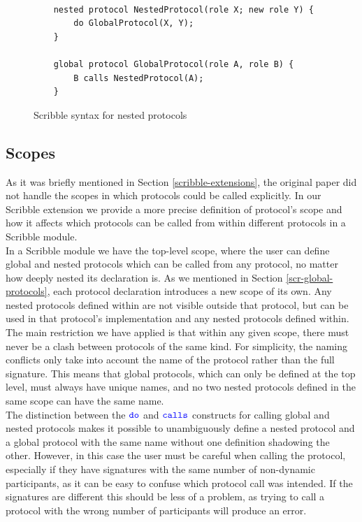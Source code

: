 \documentclass[12pt,twoside]{report}
\begin{document}
\begin{figure}[h]
    \centering
    \lstset{language=Scribble}
    \begin{lstlisting}
    
    nested protocol NestedProtocol(role X; new role Y) {
        do GlobalProtocol(X, Y);
    }
    
    global protocol GlobalProtocol(role A, role B) {
        B calls NestedProtocol(A);
    }
        \end{lstlisting}
        \caption{Scribble syntax for nested protocols}
        \label{scribble-nested-global}
    \end{figure}{}
 
\subsection{Scopes}

As it was briefly mentioned in Section \ref{scribble-extensions}, the original paper\cite{nestedprotocols} did not handle the scopes in which protocols could be called explicitly. In our Scribble extension we provide a more precise definition of protocol's scope and how it affects which protocols can be called from within different protocols in a Scribble module.\\

In a Scribble module we have the top-level scope, where the user can define global and nested protocols which can be called from any protocol, no matter how deeply nested its declaration is. As we mentioned in Section \ref{scr-global-protocols}, each protocol declaration introduces a new scope of its own.  Any nested protocols defined within are not visible outside that  protocol, but can be used in that protocol's implementation and any nested protocols defined within.\\

The main restriction we have applied is that within any given scope, there must never be a clash between protocols of the same kind. For simplicity, the naming conflicts only take into account the name of the protocol rather than the full signature. This means that global protocols, which can only be defined at the top level, must always have unique names, and no two nested protocols defined in the same scope can have the same name.\\

The distinction between the ${\color{blue}\mathtt{do}}$ and ${\color{blue}\mathtt{calls}}$ constructs for calling global and nested protocols makes it possible to unambiguously define a nested protocol and a global protocol with the same name without one definition shadowing the other. However, in this case the user must be careful when calling the protocol, especially if they have signatures with the same number of non-dynamic participants, as it can be easy to confuse which protocol call was intended. If the signatures are different this should be less of a problem, as trying to call a protocol with the wrong number of participants will produce an error.\\
\end{document}
